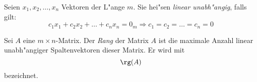 \MyBeginDef
{}
\label{DefLinearUnabhaengig}
    Seien $x_1, x_2, \ldots, x_n$ Vektoren der L"ange $m$. Sie hei"sen
    {\em linear unabh"angig}, falls gilt:
    \[ c_1 x_1 + c_2 x_2 + \ldots + c_n x_n = 0_m \Rightarrow
       c_1 = c_2 = \ldots = c_n = 0 \]
\MyEndDef

\MyBeginDef
{}
\label{DefRang}
    Sei $A$ eine $m \times n$-Matrix. Der {\em Rang} der Matrix $A$ ist
    die maximale Anzahl linear unabh"angiger Spaltenvektoren dieser Matrix.
    Er wird mit \[ \rg(A) \] bezeichnet.
\MyEndDef

